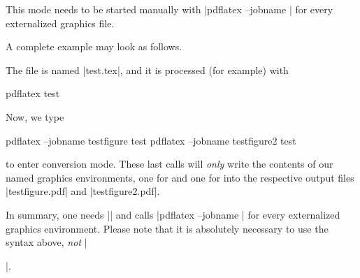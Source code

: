 {\begin{enumerate}
	This mode needs to be started manually with |pdflatex --jobname | for every externalized graphics file.
\end{enumerate}
A complete example may look as follows.
\noindent The file is named |test.tex|, and it is processed (for example) with
\begin{codeexample}
pdflatex test	
\end{codeexample}
\noindent Now, we type
\begin{codeexample}
pdflatex --jobname testfigure test	
pdflatex --jobname testfigure2 test	
\end{codeexample}
\noindent to enter conversion mode. These last calls will \emph{only} write the contents of our named graphics environments, one for  and one for  into the respective output files |testfigure.pdf| and |testfigure2.pdf|.

In summary, one needs |\pgfrealjobname| and calls |pdflatex --jobname | for every externalized graphics environment. Please note that it is absolutely necessary to use the syntax above, \emph{not} |\begin{pgfgraphicnamed}|.


\end{pgfgraphicnamed}}
